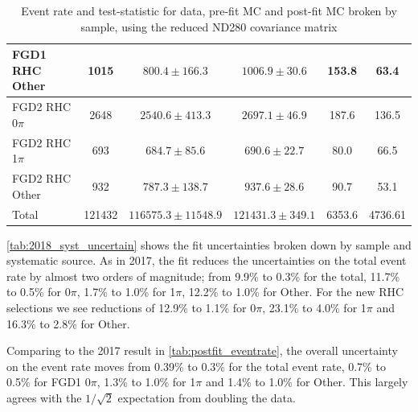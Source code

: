\begin{table}
\begin{tabular}{ l | c c c | c c }
		FGD1 \numu RHC Other 	& 1015 	& $800.4\pm166.3$	& $1006.9\pm30.6$  & 153.8  & 63.4 	\\ 
		\hline
		FGD2 \numu RHC 0$\pi$ 	& 2648  & $2540.6\pm413.3$	& $2697.1\pm46.9$ & 187.6  & 136.5 	\\ 
		FGD2 \numu RHC 1$\pi$ 	& 693 	& $684.7\pm85.6$	& $690.6\pm22.7$  & 80.0 & 66.5 	\\ 
		FGD2 \numu RHC Other 	& 932 	& $787.3\pm138.7$	& $937.6\pm28.6$  & 90.7  & 53.1 	\\ 
		\hline
		Total 				& 121432 & $116575.3\pm11548.9$	& $121431.3\pm349.1$ & 6353.6 & 4736.61 \\
		\hline
		\hline
	\end{tabular}
	\caption{Event rate and test-statistic for data, pre-fit MC and post-fit MC broken by sample, using the reduced ND280 covariance matrix}
	\label{tab:postfit_eventrate_2018}
\end{table}

\autoref{tab:2018_syst_uncertain} shows the fit uncertainties broken down by sample and systematic source. As in 2017, the fit reduces the uncertainties on the total event rate by almost two orders of magnitude; from 9.9\% to 0.3\% for the total, 11.7\% to 0.5\% for 0$\pi$, 1.7\% to 1.0\% for 1$\pi$, 12.2\% to 1.0\% for Other. For the new RHC selections we see reductions of 12.9\% to 1.1\% for 0$\pi$, 23.1\% to 4.0\% for 1$\pi$ and 16.3\% to 2.8\% for Other. 

Comparing to the 2017 result in \autoref{tab:postfit_eventrate}, the overall uncertainty on the event rate moves from 0.39\% to 0.3\% for the total event rate, 0.7\% to 0.5\% for FGD1 0$\pi$, 1.3\% to 1.0\% for 1$\pi$ and 1.4\% to 1.0\% for Other. This largely agrees with the $1/\sqrt{2}$ expectation from doubling the data.

